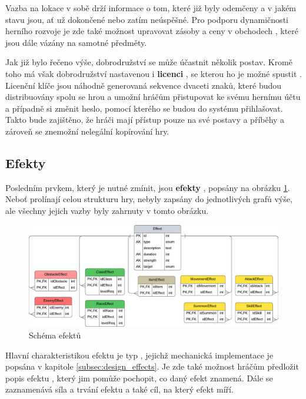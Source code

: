 Vazba na lokace  v sobě drží informace o tom, které již byly odemčeny  a v jakém stavu  jsou, ať už dokončené nebo zatím neúspěšné. Pro podporu dynamičnosti herního rozvoje je zde také možnost upravovat zásoby a ceny v obchodech , které jsou dále vázány na samotné předměty.

Jak již bylo řečeno výše, dobrodružství se může účastnit několik postav. Kromě toho má však dobrodružství nastavenou i \textbf{licenci} , se kterou ho je možné spustit . Licenční klíče jsou náhodně generovaná sekvence dvaceti znaků, které budou distribuovány spolu se hrou a umožní hráčům přistupovat ke svému hernímu účtu a případně si změnit heslo, pomocí kterého se budou do systému přihlašovat. Takto bude zajištěno, že hráči mají přístup pouze na své postavy a příběhy a zároveň se znemožní nelegální kopírování hry.


\subsection{Efekty}
\label{subsec:schema_effect}

Posledním prvkem, který je nutné zmínit, jsou \textbf{efekty} , popsány na obrázku \ref{diag:er_effect}. Neboť prolínají celou strukturu hry, nebyly zapsány do jednotlivých grafů výše, ale všechny jejich vazby byly zahrnuty v tomto obrázku. 

\begin{figure}[h]
    \centering
    \includegraphics[width=\textwidth]{../../shared/diagrams/er_effect.pdf}
    \caption{Schéma efektů}
    \label{diag:er_effect}
\end{figure}

Hlavní charakteristikou efektu je typ , jejichž mechanická implementace je popsána v kapitole \ref{subsec:design_effects}. Je zde také možnost hráčům předložit popis efektu , který jim pomůže pochopit, co daný efekt znamená. Dále se zaznamenává síla a trvání efektu a také cíl, na který efekt míří.

